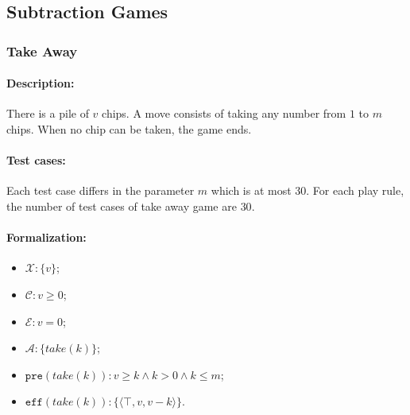 \documentclass[review]{elsarticle}
\newcommand{\set}[1]{\{ #1 \}}
\newcommand{\tuple}[1]{\langle {#1} \rangle}
\newcommand{\true}{\top}
\newcommand{\statevar}{\mathcal{X}}
\newcommand{\act}{\mathcal{A}}
\newcommand{\constraint}{\mathcal{C}}
\newcommand{\estate}{\mathcal{E}}
\newcommand{\pre}{\mathtt{pre}}
\newcommand{\eff}{\mathtt{eff}}
\begin{document}


\subsection{Subtraction Games}

\subsubsection{Take Away \protect\cite{Gol1966}}
\paragraph{Description:}
There is a pile of $v$ chips. 
A move consists of taking any number from $1$ to $m$ chips.
When no chip can be taken, the game ends.


\paragraph{Test cases:} 
Each test case differs in the parameter $m$ which is at most $30$.
For each play rule, the number of test cases of take away game are $30$. %

\paragraph{Formalization:}

\begin{itemize}
	\item $\statevar: \set{v}$;
	\item $\constraint: v \ge 0$;
	\item $\estate: v = 0$;
	\item $\act:\set{take(k)}$;
	\item $\pre(take(k)): v \ge k \wedge  k > 0 \wedge k \le m$;
	\item $\eff(take(k)): \set{\tuple{\true, v, v - k}}$.
\end{itemize}
\end{document}

